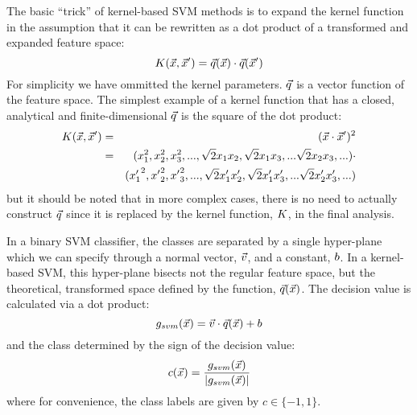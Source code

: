 \documentclass{article}
\newenvironment{eqnnon}{\begin{equation*}}{\end{equation*}}
\newenvironment{eqnarraynon}{\begin{eqnarray*}}{\end{eqnarray*}}
\begin{document}
The basic ``trick'' of kernel-based SVM methods is to expand
the kernel function in the assumption that it can be rewritten
as a dot product of a transformed and expanded feature space:
\begin{eqnnon}
	\vectorkernel(\point, \point^\prime) = \expandedspace(\point) \cdot \expandedspace(\point^\prime)
	\label{phi_def}
\end{eqnnon}
For simplicity we have ommitted the kernel parameters.
$\vec q$ is a vector function of the feature space.
The simplest example of a kernel function that has a closed, analytical and
finite-dimensional $\vec q$ is the square of the dot product:
\begin{eqnarraynon}
	\vectorkernel(\point, \point^\prime) & = & (\point \cdot \point^\prime)^2 \\ \nonumber
					 & = & (\coord_1^2, \coord_2^2, \coord_3^2, ..., \sqrt{2} \coord_1 \coord_2, \sqrt{2} \coord_1 \coord_3, ... \sqrt{2} \coord_2 \coord_3, ...) \cdot \\ \nonumber
      & &	 ({\coord^\prime_1}^2, {\coord^\prime}_2^2, {\coord^\prime}_3^2, ..., \sqrt{2} \coord^\prime_1 \coord^\prime_2, \sqrt{2} \coord^\prime_1 \coord^\prime_3, ... \sqrt{2} \coord^\prime_2 \coord^\prime_3, ...) 
\end{eqnarraynon}
but it should be noted that in more complex cases, 
there is no need to actually construct $\vec q$ since it is replaced by the 
kernel function, $K$, in the final analysis.

In a binary SVM classifier, the classes are separated by a single hyper-plane
which we can specify through a normal vector, $\vec v$, and a constant, $b$.
In a kernel-based SVM, this hyper-plane bisects not the regular feature
space, but the theoretical, transformed space defined by the function,
$\vec q(\vec {x})$.
The decision value is calculated via a dot product:
\begin{equation}
	g_{svm}(\vec {x})=\vec v \cdot \vec q(\vec {x}) + b
	\label{decision_function0}
\end{equation}
and the class determined by the sign of the decision value:
\begin{eqnnon}
	\class(\testpoint) = \frac{\svmdecision(\testpoint)}{|\svmdecision(\testpoint)|}
	\label{class_value}
\end{eqnnon}
where for convenience, the class labels are given by $c \in \lbrace -1, 1 \rbrace$.
\end{document}
